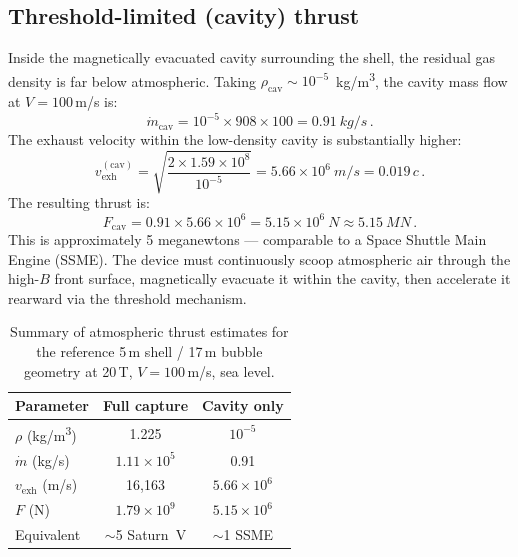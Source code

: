 \documentclass[12pt,twocolumn]{article}
\newcommand{\mdot}{\dot{m}}
\newcommand{\vexh}{v_{\mathrm{exh}}}
\begin{document}
\subsection{Threshold-limited (cavity) thrust}
\label{sec:cavity-thrust}

Inside the magnetically evacuated cavity surrounding the shell, the
residual gas density is far below atmospheric. Taking
$\rho_\mathrm{cav} \sim 10^{-5}$~\si{kg/m^3}, the cavity mass flow at
$V = 100$\,m/s is:
\begin{equation}
  \mdot_\mathrm{cav}
    = 10^{-5} \times 908 \times 100
    = 0.91~\si{kg/s}\,.
\end{equation}
The exhaust velocity within the low-density cavity is substantially
higher:
\begin{equation}
  \vexh^{(\mathrm{cav})}
    = \sqrt{\frac{2 \times 1.59 \times 10^8}{10^{-5}}}
    = 5.66 \times 10^6~\si{m/s}
    = 0.019\,c\,.
\end{equation}
The resulting thrust is:
\begin{equation}
  F_\mathrm{cav} = 0.91 \times 5.66 \times 10^6
                  = 5.15 \times 10^6~\si{N}
                  \approx 5.15~\si{MN}\,.
  \label{eq:thrust-cavity}
\end{equation}
This is approximately 5 meganewtons --- comparable to a Space Shuttle
Main Engine (SSME). The device must continuously scoop atmospheric air
through the high-$B$ front surface, magnetically evacuate it within
the cavity, then accelerate it rearward via the threshold mechanism.

\begin{table}[t]
\centering
\caption{Summary of atmospheric thrust estimates for the reference
5\,m shell / 17\,m bubble geometry at 20\,T, $V = 100$\,m/s, sea level.}
\label{tab:thrust-summary}
\begin{tabular}{@{}lcc@{}}
\toprule
Parameter & Full capture & Cavity only \\
\midrule
$\rho$ (\si{kg/m^3}) & 1.225 & $10^{-5}$ \\
$\mdot$ (\si{kg/s}) & $1.11 \times 10^5$ & 0.91 \\
$\vexh$ (\si{m/s}) & 16{,}163 & $5.66 \times 10^6$ \\
$F$ (\si{N}) & $1.79 \times 10^9$ & $5.15 \times 10^6$ \\
Equivalent & $\sim$5 Saturn~V & $\sim$1 SSME \\
\bottomrule
\end{tabular}
\end{table}
\end{document}
